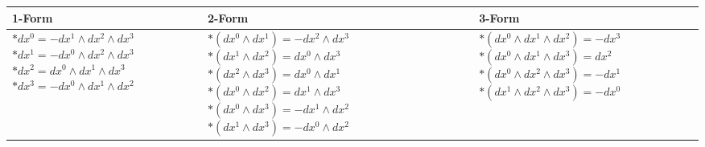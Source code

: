 \begin{center}
	\begin{tabularx}{\textwidth}{ 
			| >{\centering\arraybackslash}X 
			| >{\centering\arraybackslash}X 
			| >{\centering\arraybackslash}X | }
		\hline
		\textbf{1-Form} & \textbf{2-Form} & \textbf{3-Form} \\
		\hline
		\( *dx^0 = -dx^1 \wedge dx^2 \wedge dx^3 \) \newline
		\( *dx^1 = -dx^0 \wedge dx^2 \wedge dx^3 \) \newline
		\( *dx^2 =  dx^0 \wedge dx^1 \wedge dx^3 \) \newline
		\( *dx^3 = -dx^0 \wedge dx^1 \wedge dx^2 \) 
		&
		\( *(dx^0 \wedge dx^1) = -dx^2 \wedge dx^3 \) \newline
		\( *(dx^1 \wedge dx^2) = dx^0 \wedge dx^3 \) \newline
		\( *(dx^2 \wedge dx^3) = dx^0 \wedge dx^1 \) \newline
		\( *(dx^0 \wedge dx^2) = dx^1 \wedge dx^3 \) \newline
		\( *(dx^0 \wedge dx^3) = -dx^1 \wedge dx^2 \) \newline
		\( *(dx^1 \wedge dx^3) = -dx^0 \wedge dx^2 \)
		&
		\( *(dx^0 \wedge dx^1 \wedge dx^2) = -dx^3 \) \newline
		\( *(dx^0 \wedge dx^1 \wedge dx^3) = dx^2 \) \newline
		\( *(dx^0 \wedge dx^2 \wedge dx^3) = -dx^1 \) \newline
		\( *(dx^1 \wedge dx^2 \wedge dx^3) = -dx^0 \)
		\\
		\hline
	\end{tabularx}
\end{center}





